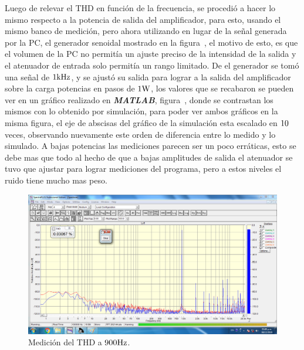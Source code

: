 Luego de relevar el THD en función de la frecuencia, se procedió a hacer lo mismo respecto a la potencia de salida del amplificador, para esto, usando el mismo banco de medición, pero ahora utilizando en lugar de la señal generada por la PC, el generador senoidal mostrado en la figura~, el motivo de esto, es que el volumen de la PC no permitía un ajuste preciso de la intensidad de la salida y el atenuador de entrada solo permitía un rango limitado. De el generador se tomó una señal de $1 \si[per-mode=symbol]{\kilo\hertz}$, y se ajustó su salida para lograr a la salida del amplificador sobre la carga potencias en pasos de $1 \si[per-mode=symbol]{\watt}$, los valores que se recabaron se pueden ver en un gráfico realizado en \textbf{\textit{MATLAB}}, figura~, donde se contrastan los mismos con lo obtenido por simulación, para poder ver ambos gráficos en la misma figura, el eje de abscisas del gráfico de la simulación esta escalado en $\num 10$ veces, observando nuevamente este orden de diferencia entre lo medido y lo simulado. A bajas potencias las mediciones parecen ser un poco erráticas, esto se debe mas que todo al hecho de que a bajas amplitudes de salida el atenuador se tuvo que ajustar para lograr mediciones del programa, pero a estos niveles el ruido tiene mucho mas peso.



\clearpage


\begin{figure}[H]
    \centering
    \includegraphics[width=0.95 \textwidth, angle=0]{img/mediciones/THD/900hz.png}
    \caption{Medición del THD a $900 \si[per-mode=symbol]{\hertz}$.}
    \label{fig:THD900Hz}
\end{figure}


